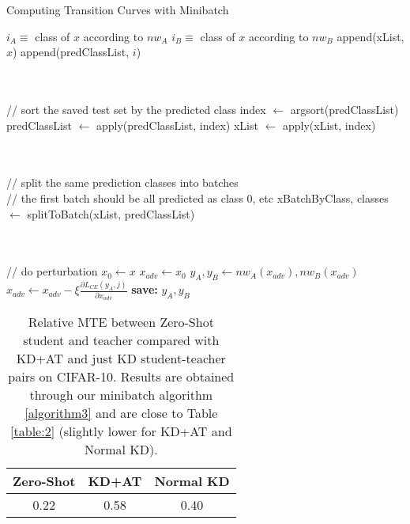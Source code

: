 \documentclass{article}
\begin{document}
\begin{algorithm}[]
    \centering
    \caption{Computing Transition Curves with Minibatch}\label{algorithm3}
    \begin{algorithmic}[1]
        \State {}
        \State {}
        \State {}
        \State {}
            \State $i_A\equiv$ class of $x$ according to $nw_A$
            \State $i_B\equiv$ class of $x$ according to $nw_B$
                \State append(xList, $x$)
                \State append(predClassList, $i$)
            \EndIf
        \EndFor

        \\ \\
        // sort the saved test set by the predicted class
        \State index $\gets$ argsort(predClassList)
        \State predClassList $\gets$ apply(predClassList, index)
        \State xList $\gets$ apply(xList, index)

        \\ \\
        // split the same prediction classes into batches
        \\
        // the first batch should be all predicted as class 0, etc
        \State xBatchByClass, classes $\gets$ splitToBatch(xList, predClassList)

        \\ \\
        // do perturbation
            \State $x_0 \gets x$
                \State $x_{adv} \gets x_0$
                    \State$y_A, y_B\gets nw_A(x_{adv}),nw_B(x_{adv})$
                    \State $x_{adv} \gets x_{adv}- \xi\frac{\partial L_{CE}(y_A,j)}{\partial x_{adv}}$
                    \State \textbf{save:} $y_A,y_B$
                \EndFor
            \EndFor
        \EndFor

    \end{algorithmic}
\end{algorithm}

\begin{table}[h] %
    \centering
    \begin{tabular}{|c|c|c|}
    \hline
    Zero-Shot & KD+AT & Normal KD\\ \hline
    0.22      & 0.58  & 0.40 \\ \hline
\end{tabular}
\caption{Relative MTE between Zero-Shot student and teacher compared with KD+AT  and just KD student-teacher pairs on CIFAR-10. Results are obtained through our minibatch algorithm \ref{algorithm3} and are close to Table \ref{table:2} (slightly lower for KD+AT and Normal KD).}
\label{table:3}
\end{table}
\end{document}
